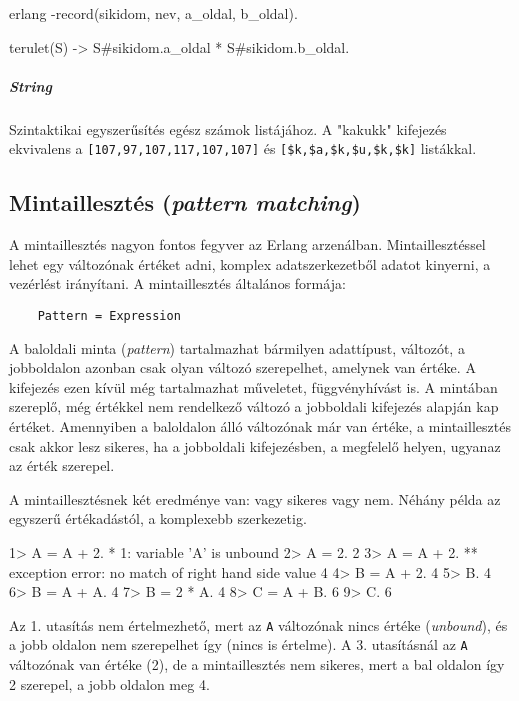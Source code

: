 \documentclass[12pt, a4paper, oneside]{book}
\begin{document}
\begin{code}{erlang}{}
-record(sikidom, { nev, a\_oldal, b\_oldal}).

terulet(S) ->
  S#sikidom.a_oldal * S#sikidom.b_oldal.
\end{code}

\subparagraph{String} Szintaktikai egyszerűsítés egész számok listájához. A
"kakukk" kifejezés ekvivalens a \texttt{[107,97,107,117,107,107]} és 
\texttt{[\$k,\$a,\$k,\$u,\$k,\$k]} listákkal.

\subsection{Mintaillesztés (\emph{pattern matching})}
A mintaillesztés nagyon fontos fegyver az Erlang arzenálban. Mintaillesztéssel
lehet egy változónak értéket adni, komplex adatszerkezetből adatot kinyerni,
a vezérlést irányítani. A mintaillesztés általános formája:

\begin{verbatim}
    Pattern = Expression
\end{verbatim}

\noindent A baloldali minta (\emph{pattern}) tartalmazhat bármilyen adattípust,
változót, a jobboldalon azonban csak olyan változó szerepelhet, amelynek van
értéke. A kifejezés ezen kívül még tartalmazhat műveletet, függvényhívást is. A
mintában szereplő, még értékkel nem rendelkező változó a jobboldali kifejezés
alapján kap értéket. Amennyiben a baloldalon álló változónak már van értéke, a
mintaillesztés csak akkor lesz sikeres, ha a jobboldali kifejezésben, a
megfelelő helyen, ugyanaz az érték szerepel.

A mintaillesztésnek két eredménye van: vagy sikeres vagy nem. Néhány példa az
egyszerű értékadástól, a komplexebb szerkezetig.

\begin{code}{}{}
1> A = A + 2.
* 1: variable 'A' is unbound
2> A = 2.
2
3> A = A + 2.
** exception error: no match of right hand side value 4
4> B = A + 2.
4
5> B.
4
6> B = A + A.
4
7> B = 2 * A.
4
8> C = A + B.
6
9> C.
6
\end{code}

\noindent Az 1. utasítás nem értelmezhető, mert az \texttt{A} változónak nincs értéke
(\emph{unbound}), és a jobb oldalon nem szerepelhet így (nincs is értelme). A 3.
utasításnál az \texttt{A} változónak van értéke (2), de a mintaillesztés nem
sikeres, mert a bal oldalon így 2 szerepel, a jobb oldalon meg 4.
\end{document}
